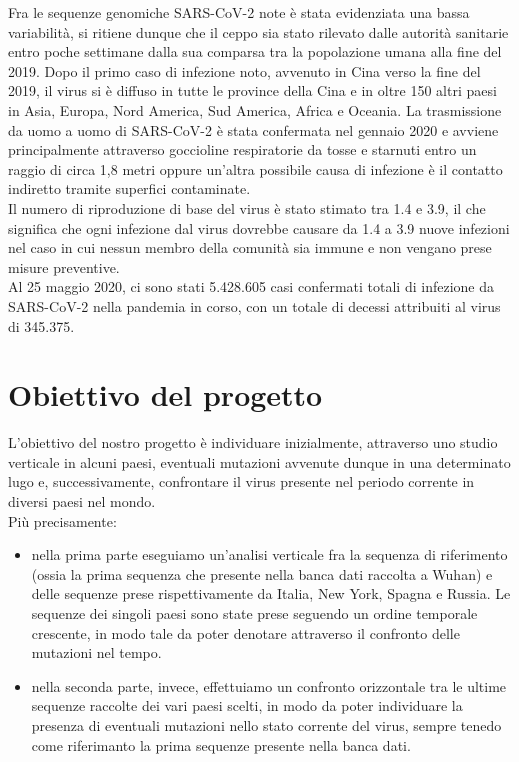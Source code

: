 \documentclass[a4paper,10pt]{article}
\begin{document}
Fra le sequenze genomiche SARS-CoV-2 note è stata evidenziata una bassa variabilità, si ritiene dunque che il ceppo sia stato rilevato dalle autorità sanitarie entro poche settimane dalla sua comparsa tra la popolazione umana alla fine del 2019.
Dopo il primo caso di infezione noto, avvenuto in Cina verso la fine del 2019, il virus si è diffuso in tutte le province della Cina e in oltre 150 altri paesi in Asia, Europa, Nord America, Sud America, Africa e Oceania.
La trasmissione da uomo a uomo di SARS-CoV-2 è stata confermata nel gennaio 2020 e avviene principalmente attraverso goccioline respiratorie da tosse e starnuti entro un raggio di circa 1,8 metri oppure un'altra possibile causa di infezione è il contatto indiretto tramite superfici contaminate.\\
Il numero di riproduzione di base del virus è stato stimato tra 1.4 e 3.9, il che significa che ogni infezione dal virus dovrebbe causare da 1.4 a 3.9 nuove infezioni nel caso in cui nessun membro della comunità sia immune e non vengano prese misure preventive.\\
Al 25 maggio 2020, ci sono stati 5.428.605 casi confermati totali di infezione da SARS-CoV-2 nella pandemia in corso, con un totale di decessi attribuiti al virus di 345.375. 

\newpage

\section*{Obiettivo del progetto}
L'obiettivo del nostro progetto è individuare inizialmente, attraverso uno studio verticale in alcuni paesi, eventuali mutazioni avvenute dunque in una determinato lugo e, successivamente, confrontare il virus presente nel periodo corrente in diversi paesi nel mondo. \\
Più precisamente: %
\begin{itemize}
\item nella prima parte eseguiamo un'analisi verticale fra la sequenza di riferimento (ossia la prima sequenza che presente nella banca dati raccolta a Wuhan) e delle sequenze prese rispettivamente da Italia, New York, Spagna e Russia. Le sequenze dei singoli paesi sono state prese seguendo un ordine temporale crescente, in modo tale da poter denotare attraverso il confronto delle mutazioni nel tempo.
\item nella seconda parte, invece, effettuiamo un confronto orizzontale tra le ultime sequenze raccolte dei vari paesi scelti, in modo da poter individuare la presenza di eventuali mutazioni nello stato corrente del virus, sempre tenedo come riferimanto la prima sequenze presente nella banca dati. 
\end{itemize}
\end{document}
